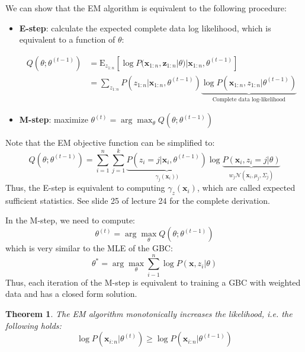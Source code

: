 \documentclass[a4paper,10pt,twoside]{article}
\newtheorem{theorem}{Theorem}
\begin{document}
We can show that the EM algorithm is equivalent to the following procedure:
\begin{itemize}
\item \textbf{E-step}: calculate the expected complete data log likelihood, which is equivalent to a function of $\theta$:

\begin{align*}
  Q(\theta;\theta^{(t-1)})&=\mathrm{E}_{z_{1:n}}[\log P(\mathbf{x}_{1:n},\mathbf{z}_{1:n}|\theta)|\mathbf{x}_{1:n},\theta^{(t-1)}]\\
                          &=\sum_{z_{1:n}} P(z_{1:n}|\mathbf{x}_{1:n},\theta^{(t-1)})\underbrace{\log P(\mathbf{x}_{1:n},z_{1:n}|\theta^{(t-1)})}_{\text{Complete data log-likelihood}}
\end{align*}
\item \textbf{M-step}: maximize $\theta^{(t)}=\arg\max_{\theta} Q(\theta;\theta^{(t-1)})$
\end{itemize}

Note that the EM objective function can be simplified to:
\begin{equation*}
  Q(\theta;\theta^{(t-1)}) = \sum_{i=1}^{n}\sum_{j=1}^{k}\underbrace{P(z_i=j|\mathbf{x}_i,\theta^{(t-1)})}_{\gamma_j(\mathbf{x}_i))}\log \underbrace{P(\mathbf{x}_i,z_i=j|\theta)}_{w_j\mathcal{N}(\mathbf{x}_i,\mu_j,\Sigma_j)}
\end{equation*}
Thus, the E-step is equivalent to computing $\gamma_z(\mathbf{x}_i)$, which are called expected sufficient statistics. See slide 25 of lecture 24 for the complete derivation.

In the M-step, we need to compute:
  \begin{equation*}
    \theta^{(t)}=\arg\max_{\theta}Q(\theta;\theta^{(t-1)})
  \end{equation*}
  which is very similar to the MLE of the GBC:
    \begin{equation*}
    \theta^{*}=\arg\max_{\theta}\sum_{i-1}^{n}\log P(\mathbf{x},z_i|\theta)
  \end{equation*}
Thus, each iteration of the M-step is equivalent to training a GBC with weighted data and has a closed form solution.

\begin{theorem}\label{th:emconvergence}
  The EM algorithm monotonically increases the likelihood, i.e. the following holds:
  \begin{equation*}
    \log P(\mathbf{x}_{i:n}|\theta^{(t)})\geq \log P(\mathbf{x}_{i:n}|\theta^{(t-1)})
  \end{equation*}
\end{theorem}
\end{document}
